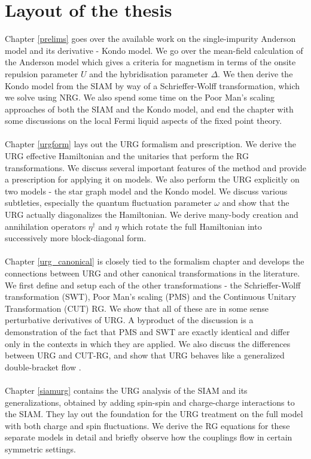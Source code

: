 \documentclass[twoside]{report}
\numberwithin{equation}{section}
\begin{document}
\section{Layout of the thesis}
Chapter \ref{prelims} goes over the available work on the single-impurity Anderson model and its derivative - Kondo model. We go over the mean-field calculation of the Anderson model which gives a criteria for magnetism in terms of the onsite repulsion parameter \(U\) and the hybridisation parameter \(\Delta\). We then derive the Kondo model from the SIAM by way of a Schrieffer-Wolff transformation, which we solve using NRG. We also spend some time on the Poor Man's scaling approaches of both the SIAM and the Kondo model, and end the chapter with some discussions on the local Fermi liquid aspects of the fixed point theory.
\\\\ Chapter \ref{urgform} lays out the URG formalism and prescription. We derive the URG effective Hamiltonian and the unitaries that perform the RG transformations. We discuss several important features of the method and provide a prescription for applying it on models. We also perform the URG explicitly on two models - the star graph model and the Kondo model. We discuss various subtleties, especially the quantum fluctuation parameter \(\omega\) and show that the URG actually diagonalizes the Hamiltonian. We derive many-body creation and annihilation operators \(\eta^\dagger\) and \(\eta\) which rotate the full Hamiltonian into successively more block-diagonal form.
\\\\ Chapter \ref{urg_canonical} is closely tied to the formalism chapter and develops the connections between URG and other canonical transformations in the literature. We first define and setup each of the other transformations - the Schrieffer-Wolff transformation (SWT), Poor Man's scaling (PMS) and the Continuous Unitary Transformation (CUT) RG. We show that all of these are in some sense perturbative derivatives of URG. A byproduct of the discussion is a demonstration of the fact that PMS and SWT are exactly identical and differ only in the contexts in which they are applied. We also discuss the differences between URG and CUT-RG, and show that URG behaves like a generalized double-bracket flow \cite{Brockett1991}.
\\\\ Chapter \ref{siamurg} contains the URG analysis of the SIAM and its generalizations, obtained by adding spin-spin and charge-charge interactions to the SIAM. They lay out the foundation for the URG treatment on the full model with both charge and spin fluctuations. We derive the RG equations for these separate models in detail and briefly observe how the couplings flow in certain symmetric settings. 
\end{document}
